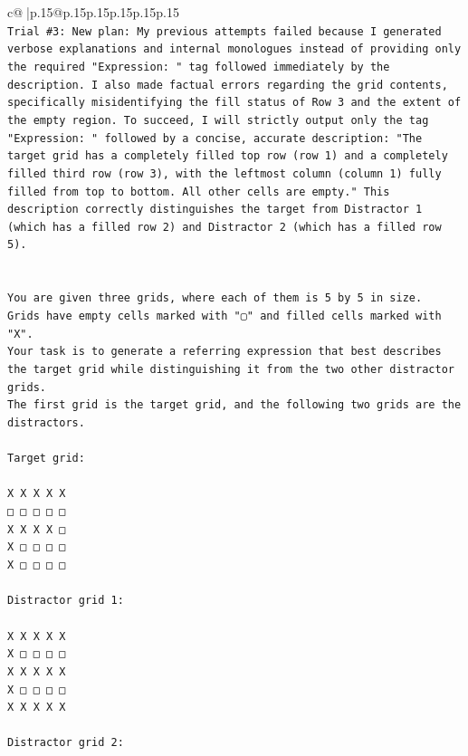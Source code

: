 \documentclass{article}
\begin{document}
{\begin{supertabular}{c@{$\;$}|p{.15\linewidth}@{}p{.15\linewidth}p{.15\linewidth}p{.15\linewidth}p{.15\linewidth}p{.15\linewidth}}
{{{\\ 
\texttt{Trial \#3: New plan: My previous attempts failed because I generated verbose explanations and internal monologues instead of providing only the required "Expression: " tag followed immediately by the description. I also made factual errors regarding the grid contents, specifically misidentifying the fill status of Row 3 and the extent of the empty region. To succeed, I will strictly output only the tag "Expression: " followed by a concise, accurate description: "The target grid has a completely filled top row (row 1) and a completely filled third row (row 3), with the leftmost column (column 1) fully filled from top to bottom. All other cells are empty." This description correctly distinguishes the target from Distractor 1 (which has a filled row 2) and Distractor 2 (which has a filled row 5).} \\
\\ 
\\ 
\texttt{You are given three grids, where each of them is 5 by 5 in size.} \\
\texttt{Grids have empty cells marked with "▢" and filled cells marked with "X".} \\
\texttt{Your task is to generate a referring expression that best describes the target grid while distinguishing it from the two other distractor grids.} \\
\texttt{The first grid is the target grid, and the following two grids are the distractors.} \\
\\ 
\texttt{Target grid:} \\
\\ 
\texttt{X X X X X} \\
\texttt{□ □ □ □ □} \\
\texttt{X X X X □} \\
\texttt{X □ □ □ □} \\
\texttt{X □ □ □ □} \\
\\ 
\texttt{Distractor grid 1:} \\
\\ 
\texttt{X X X X X} \\
\texttt{X □ □ □ □} \\
\texttt{X X X X X} \\
\texttt{X □ □ □ □} \\
\texttt{X X X X X} \\
\\ 
\texttt{Distractor grid 2:} \\
}}}
\end{supertabular}}
\end{document}
